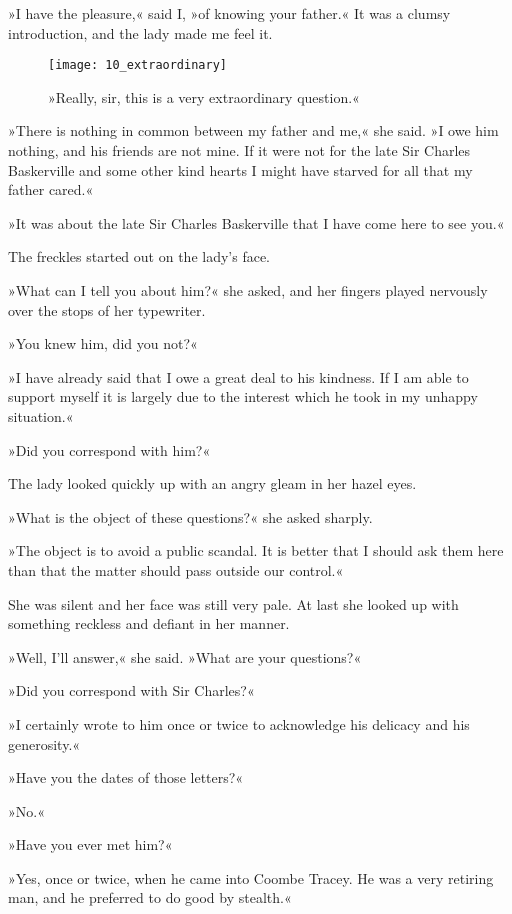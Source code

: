 »I have the pleasure,« said I, »of knowing your father.« It was a clumsy introduction, and the lady made me feel it.

\begin{figure}[tbph]
\centering
\texttt{[image: 10\_extraordinary]}
\caption{»Really, sir, this is a very extraordinary question.«}
\end{figure}

»There is nothing in common between my father and me,« she said. »I owe him nothing, and his friends are not mine. If it were not for the late Sir Charles Baskerville and some other kind hearts I might have starved for all that my father cared.«

»It was about the late Sir Charles Baskerville that I have come here to see you.«

The freckles started out on the lady's face.

»What can I tell you about him?« she asked, and her fingers played nervously over the stops of her typewriter.

»You knew him, did you not?«

»I have already said that I owe a great deal to his kindness. If I am able to support myself it is largely due to the interest which he took in my unhappy situation.«

»Did you correspond with him?«

The lady looked quickly up with an angry gleam in her hazel eyes.

»What is the object of these questions?« she asked sharply.

»The object is to avoid a public scandal. It is better that I should ask them here than that the matter should pass outside our control.«

She was silent and her face was still very pale. At last she looked up with something reckless and defiant in her manner.

»Well, I'll answer,« she said. »What are your questions?«

»Did you correspond with Sir Charles?«

»I certainly wrote to him once or twice to acknowledge his delicacy and his generosity.«

»Have you the dates of those letters?«

»No.«

»Have you ever met him?«

»Yes, once or twice, when he came into Coombe Tracey. He was a very retiring man, and he preferred to do good by stealth.«

